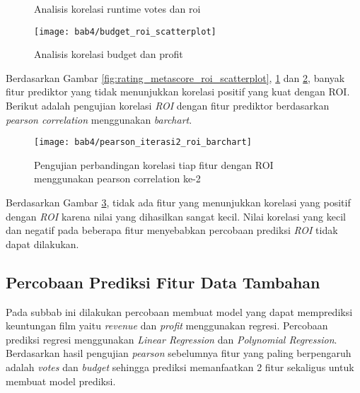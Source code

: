 \begin{figure}[H]
    \centering
    \qquad
    \caption{Analisis korelasi runtime votes dan roi}%
    \label{fig:runtime_votes_roi_scatterplot}%
\end{figure}



\begin{figure}[H]
	\centering  
	\texttt{[image: bab4/budget\_roi\_scatterplot]}   
	\caption{Analisis korelasi budget dan profit }
	\label{fig:budget_profit_scatterplot} 
\end{figure} 


Berdasarkan Gambar \ref{fig:rating_metascore_roi_scatterplot}, \ref{fig:runtime_votes_roi_scatterplot} dan \ref{fig:budget_profit_scatterplot}, banyak fitur prediktor yang tidak menunjukkan korelasi positif yang kuat dengan ROI. Berikut adalah pengujian korelasi \textit{ROI} dengan fitur prediktor berdasarkan \textit{pearson correlation} menggunakan \textit{barchart}. 


\begin{figure}[H]
	\centering  
	\texttt{[image: bab4/pearson\_iterasi2\_roi\_barchart]}   
	\caption{Pengujian perbandingan korelasi tiap fitur dengan ROI menggunakan pearson correlation ke-2}
	\label{fig:pearson_iterasi2_roi_barchart} 
\end{figure} 


Berdasarkan Gambar \ref{fig:pearson_iterasi2_roi_barchart}, tidak ada fitur yang menunjukkan korelasi yang positif dengan \textit{ROI} karena nilai yang dihasilkan sangat kecil. Nilai korelasi yang kecil dan negatif pada beberapa fitur menyebabkan percobaan prediksi \textit{ROI} tidak dapat dilakukan.



\subsection{Percobaan Prediksi Fitur Data Tambahan}
Pada subbab ini dilakukan percobaan membuat model yang dapat memprediksi keuntungan film yaitu \textit{revenue} dan \textit{profit} menggunakan regresi. Percobaan prediksi regresi menggunakan \textit{Linear Regression} dan \textit{Polynomial Regression}. Berdasarkan hasil pengujian \textit{pearson} sebelumnya fitur yang paling berpengaruh adalah \textit{votes} dan \textit{budget} sehingga prediksi memanfaatkan 2 fitur sekaligus untuk membuat model prediksi.

